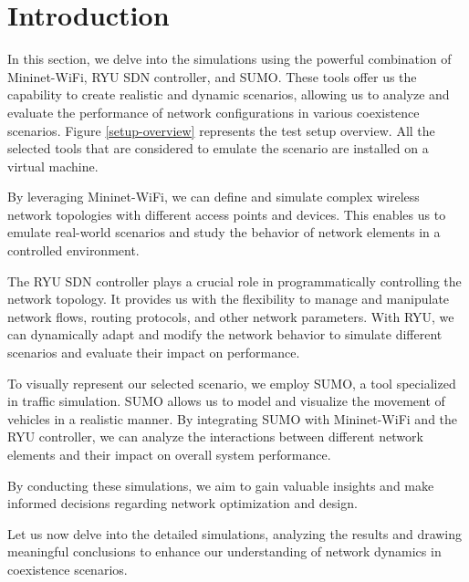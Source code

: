 \documentclass[
  oneside,
  11pt, a4paper,
  footinclude=true,
  headinclude=true,
  cleardoublepage=empty
]{scrbook}
\begin{document}
\section{Introduction}
\label{Introduction-setupoverview}


In this section, we delve into the simulations using the powerful combination of Mininet-WiFi, RYU SDN controller, and SUMO. These tools offer us the capability to create realistic and dynamic scenarios, allowing us to analyze and evaluate the performance of network configurations in various coexistence scenarios. Figure \ref{setup-overview} represents the test setup overview. All the selected tools that are considered to emulate the  scenario are installed on a virtual machine.

By leveraging Mininet-WiFi, we can define and simulate complex wireless network topologies with different access points and devices. This enables us to emulate real-world scenarios and study the behavior of network elements in a controlled environment.

The RYU SDN controller plays a crucial role in programmatically controlling the network topology. It provides us with the flexibility to manage and manipulate network flows, routing protocols, and other network parameters. With RYU, we can dynamically adapt and modify the network behavior to simulate different scenarios and evaluate their impact on performance.

To visually represent our selected scenario, we employ SUMO, a tool specialized in traffic simulation. SUMO allows us to model and visualize the movement of vehicles in a realistic manner. By integrating SUMO with Mininet-WiFi and the RYU controller, we can analyze the interactions between different network elements and their impact on overall system performance.

By conducting these simulations, we aim to gain valuable insights and make informed decisions regarding network optimization and design.

Let us now delve into the detailed simulations, analyzing the results and drawing meaningful conclusions to enhance our understanding of network dynamics in coexistence scenarios.
\end{document}
